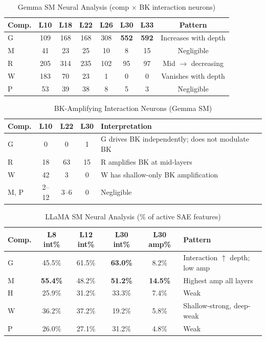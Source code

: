 \documentclass[11pt,a4paper]{article}
\begin{document}
\begin{table}[H]
\centering
\caption{Gemma SM Neural Analysis (comp $\times$ BK interaction neurons)}\label{tab:t25}
\footnotesize
\begin{tabular}{lccccccc}
\toprule
Comp. & L10 & L18 & L22 & L26 & L30 & L33 & Pattern \\
\midrule
G & 109 & 168 & 168 & 308 & \textbf{552} & \textbf{592} & Increases with depth \\
M & 41  & 23  & 25  & 10  & 8   & 15  & Negligible \\
R & 205 & 314 & 235 & 102 & 95  & 97  & Mid $\rightarrow$ decreasing \\
W & 183 & 70  & 23  & 1   & 0   & 0   & Vanishes with depth \\
P & 53  & 39  & 38  & 8   & 5   & 3   & Negligible \\
\bottomrule
\end{tabular}
\end{table}

\begin{table}[H]
\centering
\caption{BK-Amplifying Interaction Neurons (Gemma SM)}\label{tab:t26}
\footnotesize
\begin{tabular}{lcccl}
\toprule
Comp. & L10 & L22 & L30 & Interpretation \\
\midrule
G    & 0  & 0  & 1  & G drives BK independently; does not modulate BK \\
R    & 18 & 63 & 15 & R amplifies BK at mid-layers \\
W    & 42 & 3  & 0  & W has shallow-only BK amplification \\
M, P & 2--12 & 3--6 & 0 & Negligible \\
\bottomrule
\end{tabular}
\end{table}

\begin{table}[H]
\centering
\caption{LLaMA SM Neural Analysis (\% of active SAE features)}\label{tab:t27}
\footnotesize
\begin{tabular}{lccccl}
\toprule
Comp. & L8 int\% & L12 int\% & L30 int\% & L30 amp\% & Pattern \\
\midrule
G & 45.5\% & 61.5\% & \textbf{63.0\%} & 8.2\% & Interaction $\uparrow$ depth; low amp \\
M & \textbf{55.4\%} & 48.2\% & \textbf{51.2\%} & \textbf{14.5\%} & Highest amp all layers \\
H & 25.9\% & 31.2\% & 33.3\% & 7.4\% & Weak \\
W & 36.2\% & 37.2\% & 19.2\% & 5.8\% & Shallow-strong, deep-weak \\
P & 26.0\% & 27.1\% & 31.2\% & 4.8\% & Weak \\
\bottomrule
\end{tabular}
\end{table}
\end{document}
